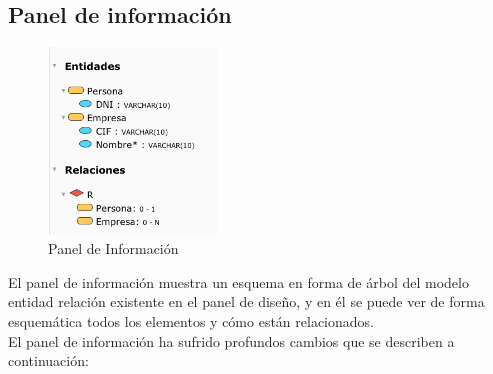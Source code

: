 \subsection{Panel de información}

\begin{figure}[H]
    \centering
    \includegraphics[width=0.4\textwidth]{img/PanelInfo.png}
    \caption{Panel de Información}
\end{figure}

El panel de información muestra un esquema en forma de árbol del modelo entidad relación existente en el panel de diseño, y en él se puede ver de forma esquemática todos los elementos y cómo están relacionados.\\

El panel de información ha sufrido profundos cambios que se describen a continuación:

